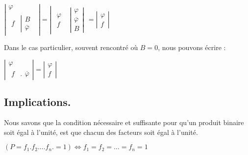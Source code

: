 \begin{center}
$\left|\begin{array}{c}
\varphi\\
\begin{array}{cc}
f & \left|\begin{array}{c}
B\\
\bar{\varphi}
\end{array}\right.\end{array}
\end{array}\right|=\left|\begin{array}{cc}
\begin{array}{c}
\varphi\\
f
\end{array} & \left|\begin{array}{c}
\varphi\\
\overline{\varphi}\\
B
\end{array}\right|\end{array}\right.=\left|\begin{array}{c}
\varphi\\
f
\end{array}\right|$

\end{center}

Dans le cas particulier, souvent rencontré où $B=0$, nous pouvons
écrire : 

\begin{center}
$\left|\begin{array}{c}
\varphi\\
\begin{array}{cc}
f & .\end{array}\overline{\varphi}
\end{array}\right|=\left|\begin{array}{c}
\varphi\\
f
\end{array}\right|$
\end{center}

\subsection{Implications. }

Nous savons que la condition nécessaire et suffisante pour qu'un produit
binaire soit égal à l'unité, est que chacun des facteurs soit égal
à l'unité.

\begin{center}
$(P=f_{1}.f_{2}.\ldots f_{n}.=1)\Longleftrightarrow f_{1}=f_{2}=\ldots=f_{n}=1$
\end{center}

